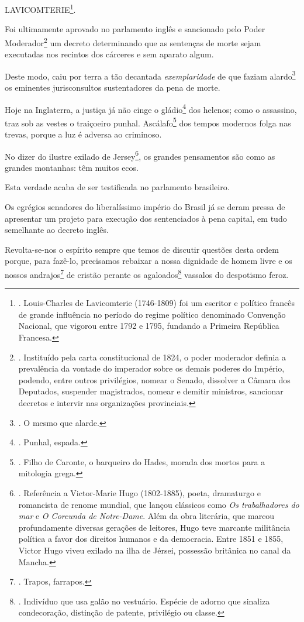 LAVICOMTERIE\footnote{. Louis-Charles de Lavicomterie (1746-1809) foi um
  escritor e político francês de grande influência no período do regime
  político denominado Convenção Nacional, que vigorou entre 1792 e 1795,
  fundando a Primeira República Francesa.}.

Foi ultimamente aprovado no parlamento inglês e sancionado pelo Poder
Moderador\footnote{. Instituído pela carta constitucional de 1824, o
  poder moderador definia a prevalência da vontade do imperador sobre os
  demais poderes do Império, podendo, entre outros privilégios, nomear o
  Senado, dissolver a Câmara dos Deputados, suspender magistrados,
  nomear e demitir ministros, sancionar decretos e intervir nas
  organizações provinciais.} um decreto determinando que as sentenças de
morte sejam executadas nos recintos dos cárceres e sem aparato algum.

Deste modo, caiu por terra a tão decantada \emph{exemplaridade} de que
faziam alardo\footnote{. O mesmo que alarde.} os eminentes
jurisconsultos sustentadores da pena de morte.

Hoje na Inglaterra, a justiça já não cinge o gládio\footnote{. Punhal,
  espada.} dos helenos; como o assassino, traz sob as vestes o
traiçoeiro punhal. Ascálafo\footnote{. Filho de Caronte, o barqueiro do
  Hades, morada dos mortos para a mitologia grega.} dos tempos modernos
folga nas trevas, porque a luz é adversa ao criminoso.

No dizer do ilustre exilado de Jersey\footnote{. Referência a
  Victor-Marie Hugo (1802-1885), poeta, dramaturgo e romancista de
  renome mundial, que lançou clássicos como \emph{Os trabalhadores do
  mar} e \emph{O Corcunda de Notre-Dame}. Além da obra literária, que
  marcou profundamente diversas gerações de leitores, Hugo teve marcante
  militância política a favor dos direitos humanos e da democracia.
  Entre 1851 e 1855, Victor Hugo viveu exilado na ilha de Jérsei,
  possessão britânica no canal da Mancha.}, os grandes pensamentos são
como as grandes montanhas: têm muitos ecos.

Esta verdade acaba de ser testificada no parlamento brasileiro.

Os egrégios senadores do liberalíssimo império do Brasil já se deram
pressa de apresentar um projeto para execução dos sentenciados à pena
capital, em tudo semelhante ao decreto inglês.

Revolta-se-nos o espírito sempre que temos de discutir questões desta
ordem porque, para fazê-lo, precisamos rebaixar a nossa dignidade de
homem livre e os nossos andrajos\footnote{. Trapos, farrapos.} de
cristão perante os agaloados\footnote{. Indivíduo que usa galão no
  vestuário. Espécie de adorno que sinaliza condecoração, distinção de
  patente, privilégio ou classe.} vassalos do despotismo feroz.

